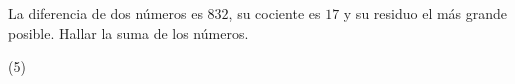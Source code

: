 \item{La diferencia de dos números es $832$, su cociente es $17$ y su residuo el más grande posible. Hallar la suma de los números.
	\begin{tasks}(5)
	\end{tasks}
}
